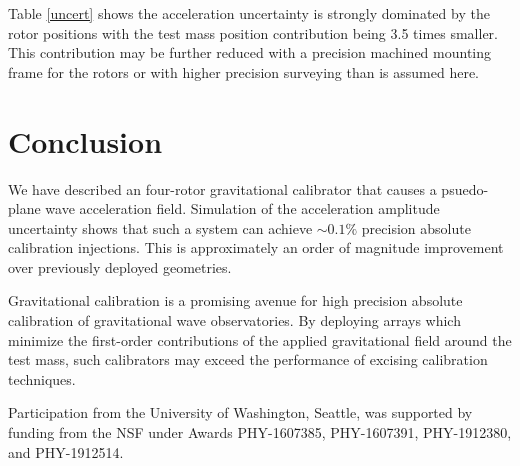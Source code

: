 \documentclass[superscriptaddress, twocolumn, prd]{revtex4-1}
\begin{document}
Table \ref{uncert} shows the acceleration uncertainty is strongly dominated by the rotor positions with the test mass position contribution being 3.5 times smaller. This contribution may be further reduced with a precision machined mounting frame for the rotors or with higher precision surveying than is assumed here.
\\
\section{Conclusion} 
\quad We have described an four-rotor gravitational calibrator that causes a psuedo-plane wave acceleration field. Simulation of the acceleration amplitude uncertainty shows that such a system can achieve $\sim0.1\%$ precision absolute calibration injections. This is approximately an order of magnitude improvement over previously deployed geometries.\cite{ncal} 

Gravitational calibration is a promising avenue for high precision absolute calibration of gravitational wave observatories. By deploying arrays which minimize the first-order contributions of the applied gravitational field around the test mass, such calibrators may exceed the performance of excising calibration techniques.

\begin{acknowledgements}

Participation from the University of Washington, Seattle, was supported by funding from the NSF under Awards PHY-1607385, PHY-1607391, PHY-1912380, and PHY-1912514.

\end{acknowledgements}


 

\end{document}
